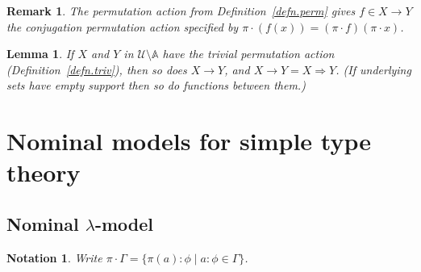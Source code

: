 \documentclass[submission,copyright]{eptcs}
\newtheorem{lemm}[thrm]{Lemma}
\newtheorem{nttn}[thrm]{Notation}
\newtheorem{rmrk}[thrm]{Remark}
\newcommand\fto{{\to}}
\newcommand\limp{{\Rightarrow}}
\newcommand{\act}{{\cdot}}
\begin{document}
\begin{rmrk}
The permutation action from Definition~\ref{defn.perm} gives $f\in X\fto Y$ the \emph{conjugation} permutation action specified by $\pi\act (f(x)) = (\pi\act f)(\pi\act x)$.
\end{rmrk}

\begin{lemm}
\label{lemm.triv.func}
If $X$ and $Y$ in $\mathcal U\setminus\mathbb A$ have the trivial permutation action (Definition~\ref{defn.triv}), then so does $X\fto Y$, and $X\fto Y= X\limp Y$. 
(If underlying sets have empty support then so do functions between them.) 
\end{lemm}

\section{Nominal models for simple type theory}
\label{sect.nominal.models}
\subsection{Nominal $\lambda$-model}
\label{subsect.lambda.model}

\begin{nttn}
\label{nttn.pi.Gamma}
Write $\pi\act\Gamma=\{\pi(a){:}\phi\mid a{:}\phi\in\Gamma\}$. 
\end{nttn}
\end{document}
